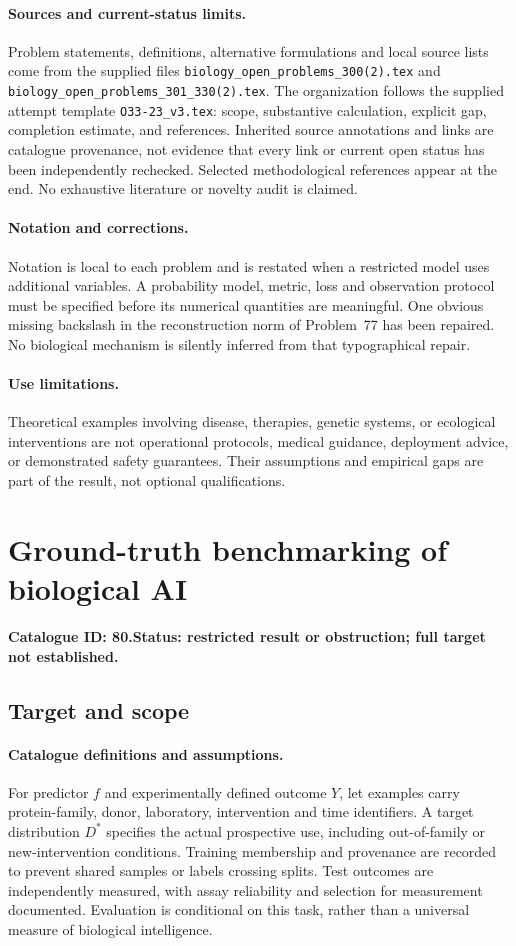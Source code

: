 \documentclass[11pt]{article}
\begin{document}
\paragraph{Sources and current-status limits.}
Problem statements, definitions, alternative formulations and local source lists
come from the supplied files
\texttt{biology\_open\_problems\_300(2).tex} and
\texttt{biology\_open\_problems\_301\_330(2).tex}.
The organization follows the supplied attempt template
\texttt{O33-23\_v3.tex}: scope, substantive calculation, explicit gap,
completion estimate, and references. Inherited source annotations and links are
catalogue provenance, not evidence that every link or current open status has
been independently rechecked. Selected methodological references appear at the
end. No exhaustive literature or novelty audit is claimed.

\paragraph{Notation and corrections.}
Notation is local to each problem and is restated when a restricted model uses
additional variables. A probability model, metric, loss and observation protocol
must be specified before its numerical quantities are meaningful. One obvious
missing backslash in the reconstruction norm of Problem~77 has been repaired.
No biological mechanism is silently inferred from that typographical repair.

\paragraph{Use limitations.}
Theoretical examples involving disease, therapies, genetic systems, or ecological
interventions are not operational protocols, medical guidance, deployment advice,
or demonstrated safety guarantees. Their assumptions and empirical gaps are part
of the result, not optional qualifications.

\setcounter{section}{79}
\section{Ground-truth benchmarking of biological AI}
\label{prob:080}
\noindent\textbf{Catalogue ID: 80.}\quad \textbf{Status: restricted result or obstruction; full target not established.}
\subsection{Target and scope}
\paragraph{Catalogue definitions and assumptions.}
For predictor $f$ and experimentally defined outcome $Y$, let examples carry protein-family, donor, laboratory, intervention and time identifiers. A target distribution $D^*$ specifies the actual prospective use, including out-of-family or new-intervention conditions. Training membership and provenance are recorded to prevent shared samples or labels crossing splits. Test outcomes are independently measured, with assay reliability and selection for measurement documented. Evaluation is conditional on this task, rather than a universal measure of biological intelligence.
\end{document}
